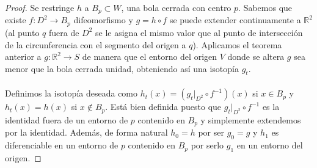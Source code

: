 \begin{proof}
	Se restringe $h$ a $B_p \subset W$, una bola cerrada con centro $p$. Sabemos que existe $f: D^2 \rightarrow B_p$ difeomorfismo y $g=h \circ f$ se puede extender continuamente a $\mathbb{R}^2$ (al punto $q$ fuera de $D^2$ se le asigna el mismo valor que al punto de intersección de la circunferencia con el segmento del origen a $q$). Aplicamos el teorema anterior a $g:\mathbb{R}^2 \rightarrow S$ de manera que el entorno del origen $V$ donde se altera $g$ sea menor que la bola cerrada unidad, obteniendo así una isotopía $g_t$.\\
	\\Definimos la isotopía deseada como $h_t(x) = (g_t|_{D^2} \circ f^{-1})(x)$ si $x \in B_p$ y $h_t(x) = h(x)$ si $x \not \in B_p$. Está bien definida puesto que $g_t|_{D^2} \circ f^{-1}$ es la identidad fuera de un entorno de $p$ contenido en $B_p$ y simplemente extendemos por la identidad. Además, de forma natural $h_0 = h$ por ser $g_0 = g$ y $h_1$ es diferenciable en un entorno de $p$ contenido en $B_p$ por serlo $g_1$ en un entorno del origen.
\end{proof}



\endinput
